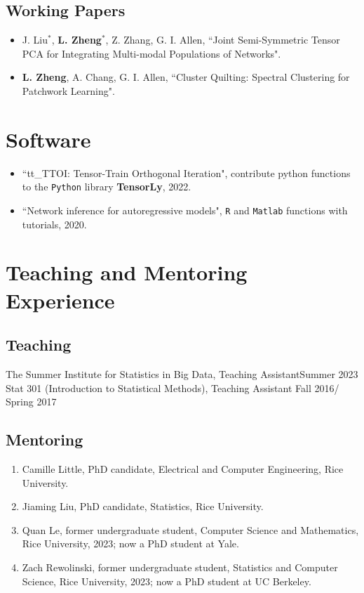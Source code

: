 \documentclass[letterpaper,11pt]{article}
\begin{document}
	\subsection*{Working Papers}
	\begin{itemize}
		\item J. Liu$^{*}$, {\bf L. Zheng}$^{*}$, Z. Zhang, G. I. Allen, ``Joint Semi-Symmetric Tensor PCA for Integrating Multi-modal Populations of Networks".
		\item {\bf L. Zheng}, A. Chang, G. I. Allen, ``Cluster Quilting: Spectral Clustering for Patchwork Learning".
	\end{itemize}
	\section{Software}
	\begin{itemize}
		\item ``tt\_TTOI: Tensor-Train Orthogonal Iteration", contribute python functions to the \verb|Python| library {\bf TensorLy}, 2022.
		\item ``Network inference for autoregressive models", \verb|R| and \verb|Matlab| functions with tutorials, 2020.
	\end{itemize}
	\section{Teaching and Mentoring Experience}
	\subsection*{Teaching}
	The Summer Institute for Statistics in Big Data, Teaching Assistant\hfill Summer 2023\\
	Stat 301 (Introduction to Statistical Methods), Teaching Assistant \hfill Fall 2016/ Spring 2017
	\subsection*{Mentoring}
	\begin{enumerate}
		\item Camille Little, PhD candidate, Electrical and Computer Engineering, Rice University.
		\item Jiaming Liu, PhD candidate, Statistics, Rice University.
		\item Quan Le, former undergraduate student, Computer Science and Mathematics, Rice University, 2023; now a PhD student at Yale.
		\item Zach Rewolinski, former undergraduate student, Statistics and Computer Science, Rice University, 2023; now a PhD student at UC Berkeley.
	\end{enumerate}
\end{document}
